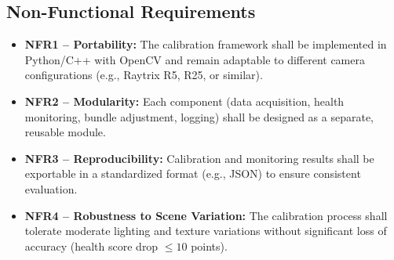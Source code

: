\documentclass[12pt]{scrartcl}
\begin{document}
\subsection*{Non-Functional Requirements}
\begin{itemize}
  \item \textbf{NFR1 – Portability:} 
  The calibration framework shall be implemented in Python/C++ with OpenCV
  and remain adaptable to different camera configurations (e.g., Raytrix R5, R25, or similar).
  \item \textbf{NFR2 – Modularity:} 
  Each component (data acquisition, health monitoring, bundle adjustment, logging)
  shall be designed as a separate, reusable module.
  \item \textbf{NFR3 – Reproducibility:} 
  Calibration and monitoring results shall be exportable in a standardized format
  (e.g., JSON) to ensure consistent evaluation.
  \item \textbf{NFR4 – Robustness to Scene Variation:} 
  The calibration process shall tolerate moderate lighting and texture variations
  without significant loss of accuracy (health score drop $\leq10$ points).
\end{itemize}
\end{document}
